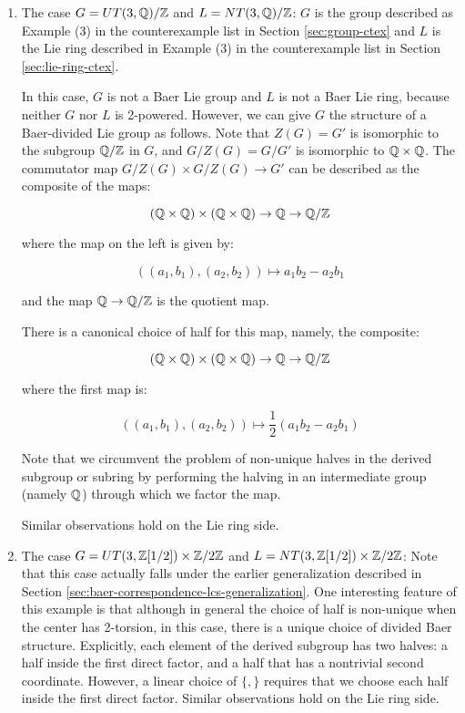 \begin{enumerate}
\item The case $G = UT(3,\mathbb{Q})/\mathbb{Z}$ and $L = NT(3,\mathbb{Q})/\mathbb{Z}$: $G$ is the
  group described as Example (3) in the counterexample list in Section
  \ref{sec:group-ctex} and $L$ is the Lie ring described in Example
  (3) in the counterexample list in Section \ref{sec:lie-ring-ctex}.

  In this case, $G$ is not a Baer Lie group and $L$ is not a Baer Lie
  ring, because neither $G$ nor $L$ is 2-powered. However, we can give
  $G$ the structure of a Baer-divided Lie group as follows. Note that
  $Z(G) = G'$ is isomorphic to the subgroup $\mathbb{Q}/\mathbb{Z}$ in $G$, and
  $G/Z(G) = G/G'$ is isomorphic to $\mathbb{Q} \times \mathbb{Q}$. The commutator map
  $G/Z(G) \times G/Z(G) \to G'$ can be described as the composite of
  the maps:

  $$(\mathbb{Q} \times \mathbb{Q}) \times (\mathbb{Q} \times \mathbb{Q}) \to \mathbb{Q} \to \mathbb{Q}/\mathbb{Z}$$

  where the map on the left is given by:

  $$((a_1,b_1),(a_2,b_2)) \mapsto a_1b_2 - a_2b_1$$

  and the map $\mathbb{Q} \to \mathbb{Q}/\mathbb{Z}$ is the quotient map.

  There is a canonical choice of half for this map, namely, the composite:

  $$(\mathbb{Q} \times \mathbb{Q}) \times (\mathbb{Q} \times \mathbb{Q}) \to \mathbb{Q} \to \mathbb{Q}/\mathbb{Z}$$

  where the first map is:

  $$((a_1,b_1),(a_2,b_2)) \mapsto \frac{1}{2}(a_1b_2 - a_2b_1)$$

  Note that we circumvent the problem of non-unique halves in the
  derived subgroup or subring by performing the halving in an
  intermediate group (namely $\mathbb{Q}$) through which we factor the map.

  Similar observations hold on the Lie ring side.

\item The case $G = UT(3,\mathbb{Z}[1/2]) \times \mathbb{Z}/2\mathbb{Z}$ and $L =
  NT(3,\mathbb{Z}[1/2]) \times \mathbb{Z}/2\mathbb{Z}$: Note that this case actually falls
  under the earlier generalization described in Section
  \ref{sec:baer-correspondence-lcs-generalization}. One interesting
  feature of this example is that although in general the choice of
  half is non-unique when the center has 2-torsion, in this case,
  there is a unique choice of divided Baer structure. Explicitly, each
  element of the derived subgroup has two halves: a half inside the
  first direct factor, and a half that has a nontrivial second
  coordinate. However, a linear choice of $\{ , \}$ requires that we
  choose each half inside the first direct factor. Similar
  observations hold on the Lie ring side.


\end{enumerate}
